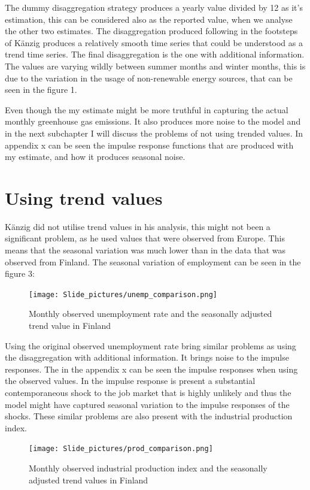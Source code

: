 \documentclass[
  12pt,
  a4paper,
]{report}
\begin{document}
The dummy disaggregation strategy produces a yearly value divided by 12 as it's estimation, this can be considered also as the reported value, when we analyse the other two estimates. The disaggregation produced following in the footsteps of Känzig produces a relatively smooth time series that could be understood as a trend time series. The final disaggregation is the one with additional information. The values are varying wildly between summer months and winter months, this is due to the variation in the usage of non-renewable energy sources, that can be seen in the figure 1.

Even though the my estimate might be more truthful in capturing the actual monthly greenhouse gas emissions. It also produces more noise to the model and in the next subchapter I will discuss the problems of not using trended values. In appendix x can be seen the impulse response functions that are produced with my estimate, and how it produces seasonal noise.

\hypertarget{using-trend-values}{%
\section{Using trend values}\label{using-trend-values}}

Känzig did not utilise trend values in his analysis, this might not been a significant problem, as he used values that were observed from Europe. This means that the seasonal variation was much lower than in the data that was observed from Finland. The seasonal variation of employment can be seen in the figure 3:

\begin{figure}
\centering
\texttt{[image: Slide\_pictures/unemp\_comparison.png]}
\caption{Monthly observed unemployment rate and the seasonally adjusted trend value in Finland}
\end{figure}

Using the original observed unemployment rate bring similar problems as using the disaggregation with additional information. It brings noise to the impulse responses. The in the appendix x can be seen the impulse responses when using the observed values. In the impulse response is present a substantial contemporaneous shock to the job market that is highly unlikely and thus the model might have captured seasonal variation to the impulse responses of the shocks. These similar problems are also present with the industrial production index.

\begin{figure}
\centering
\texttt{[image: Slide\_pictures/prod\_comparison.png]}
\caption{Monthly observed industrial production index and the seasonally adjusted trend values in Finland}
\end{figure}
\end{document}
